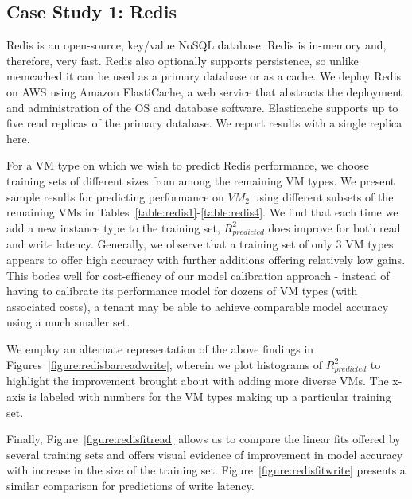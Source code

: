 


\subsection{Case Study 1: Redis}
\label{sec:redis}
\vspace{10pt}

Redis is an open-source, key/value NoSQL database.  Redis is in-memory and,  therefore,  very fast.  Redis also optionally supports persistence, so unlike memcached it can be used as a primary database or as a cache.
We deploy Redis on AWS using Amazon ElastiCache, a web service that abstracts the deployment and administration of the OS and database software.  Elasticache supports up to five read replicas of the primary database. We report results with a single replica here.




For a VM type on which we wish to predict Redis performance, we choose training sets of different sizes from among the remaining VM types. We present sample results for predicting performance on $VM_2$ using different subsets of the remaining VMs in Tables~\ref{table:redis1}-\ref{table:redis4}. We find that each time we add a new instance type to the training set, $R^2_{predicted}$ does improve for both read and write latency. Generally, we observe that a training set of only 3 VM types appears to offer high accuracy with further additions offering relatively low gains. This bodes well for cost-efficacy of our model calibration approach - instead of having to calibrate its performance model for dozens of VM types (with associated costs), a tenant may be able to achieve comparable model accuracy using a much smaller set. 



We employ an alternate representation of the above findings in Figures~\ref{figure:redisbarreadwrite}, wherein we plot histograms of $R^2_{predicted}$ to highlight the improvement brought about with adding more diverse VMs. The x-axis is labeled with numbers for the VM types making up a particular training set. 

Finally, Figure~\ref{figure:redisfitread} allows us to compare the linear fits offered by several training sets and offers visual evidence of improvement in model accuracy with increase in the size of the training set. Figure~\ref{figure:redisfitwrite} presents a similar comparison for predictions of write latency. 



